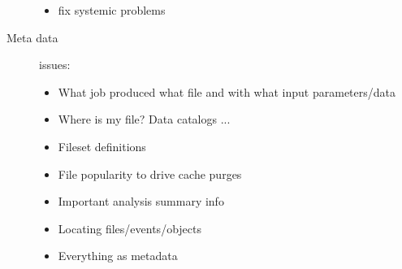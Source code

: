 \begin{description}
\begin{itemize}
  \item fix systemic problems
  \end{itemize}
\item[Meta data] issues:
  \begin{itemize}
  \item What job produced what file and with what input parameters/data
  \item Where is my file? Data catalogs ...
  \item Fileset definitions
  \item File popularity to drive cache purges
  \item Important analysis summary info
  \item Locating files/events/objects
  \item Everything as metadata
  \end{itemize}
\end{description}


